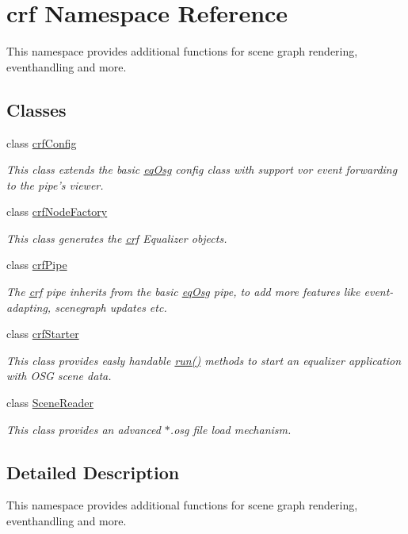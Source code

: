 \hypertarget{a00043}{
\section{crf Namespace Reference}
\label{a00043}
}
This namespace provides additional functions for scene graph rendering, eventhandling and more.  


\subsection*{Classes}
\begin{CompactItemize}
\item 
class \hyperlink{a00004}{crfConfig}
\begin{CompactList}\small\item\em This class extends the basic \hyperlink{a00045}{eqOsg} config class with support vor event forwarding to the pipe's viewer. \item\end{CompactList}\item 
class \hyperlink{a00005}{crfNodeFactory}
\begin{CompactList}\small\item\em This class generates the \hyperlink{a00043}{crf} Equalizer objects. \item\end{CompactList}\item 
class \hyperlink{a00006}{crfPipe}
\begin{CompactList}\small\item\em The \hyperlink{a00043}{crf} pipe inherits from the basic \hyperlink{a00045}{eqOsg} pipe, to add more features like event-adapting, scenegraph updates etc. \item\end{CompactList}\item 
class \hyperlink{a00007}{crfStarter}
\begin{CompactList}\small\item\em This class provides easly handable \hyperlink{a00007_bff219a07f93750e4e6db09fd026de7f}{run()} methods to start an equalizer application with OSG scene data. \item\end{CompactList}\item 
class \hyperlink{a00015}{SceneReader}
\begin{CompactList}\small\item\em This class provides an advanced $\ast$.osg file load mechanism. \item\end{CompactList}\end{CompactItemize}


\subsection{Detailed Description}
This namespace provides additional functions for scene graph rendering, eventhandling and more. 

